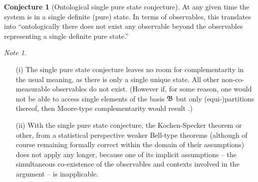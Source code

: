 \documentclass[%
  preprint,
 showpacs,
 showkeys,
 preprintnumbers,
 amsmath,amssymb,
 aps,
 prl,
  longbibliography,
 ]{revtex4-1}
\theoremstyle{definition}
\newtheorem{conjecture}{Conjecture}
\theoremstyle{remark}
\newtheorem*{note}{Note}
\begin{document}
\begin{conjecture}[Ontological single pure state conjecture]
At any given time the system is in a single definite (pure) state.
In terms of observables, this translates into
``ontologically there does not exist any observable beyond the observables representing a single definite pure state.''
\end{conjecture}

\begin{note}
\begin{itemize}
\item[(i)]
The  single pure state conjecture leaves no room for complementarity in the usual meaning,
as there is only a single unique state. All other non-co-measurable observables do not exist.
(However if, for some reason, one would not be able to access
single elements of  the basis ${\frak B}$ but only (equi-)partitions thereof,
then Moore-type complementarity would result \cite{svozil-2008-ql}.)

\item[(ii)]
With the  single pure state conjecture,
the Kochen-Specker theorem or other, from a statistical perspective weaker Bell-type theorems \cite{mermin-93}
(although of course remaining formally correct within the domain of their assumptions) does not apply any longer,
because one of its implicit assumptions --
the simultaneous co-existence of the observables and contexts involved in the argument --
is inapplicable.


\end{itemize}
\end{note}
\end{document}
